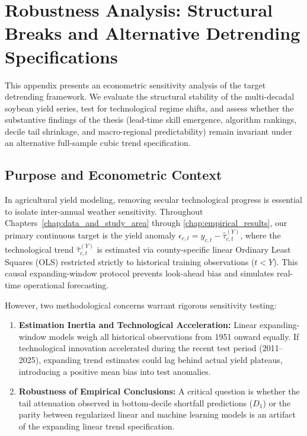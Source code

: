 \chapter{Robustness Analysis: Structural Breaks and Alternative Detrending Specifications}
\label{chap:appendix_detrending}

This appendix presents an econometric sensitivity analysis of the target detrending framework. We evaluate the structural stability of the multi-decadal soybean yield series, test for technological regime shifts, and assess whether the substantive findings of the thesis (lead-time skill emergence, algorithm rankings, decile tail shrinkage, and macro-regional predictability) remain invariant under an alternative full-sample cubic trend specification.


\section{Purpose and Econometric Context}
\label{sec:app_context}

In agricultural yield modeling, removing secular technological progress is essential to isolate inter-annual weather sensitivity. Throughout Chapters~\ref{chap:data_and_study_area} through \ref{chap:empirical_results}, our primary continuous target is the yield anomaly $\epsilon_{c, t} = y_{c, t} - \hat{\tau}_{c, t}^{(Y)}$, where the technological trend $\hat{\tau}_{c, t}^{(Y)}$ is estimated via county-specific linear Ordinary Least Squares (OLS) restricted strictly to historical training observations ($t < Y$). This causal expanding-window protocol prevents look-ahead bias and simulates real-time operational forecasting.

However, two methodological concerns warrant rigorous sensitivity testing:
\begin{enumerate}
    \item \textbf{Estimation Inertia and Technological Acceleration:} Linear expanding-window models weigh all historical observations from 1951 onward equally. If technological innovation accelerated during the recent test period (2011--2025), expanding trend estimates could lag behind actual yield plateaus, introducing a positive mean bias into test anomalies.
    \item \textbf{Robustness of Empirical Conclusions:} A critical question is whether the tail attenuation observed in bottom-decile shortfall predictions ($D_1$) or the parity between regularized linear and machine learning models is an artifact of the expanding linear trend specification.
\end{enumerate}

